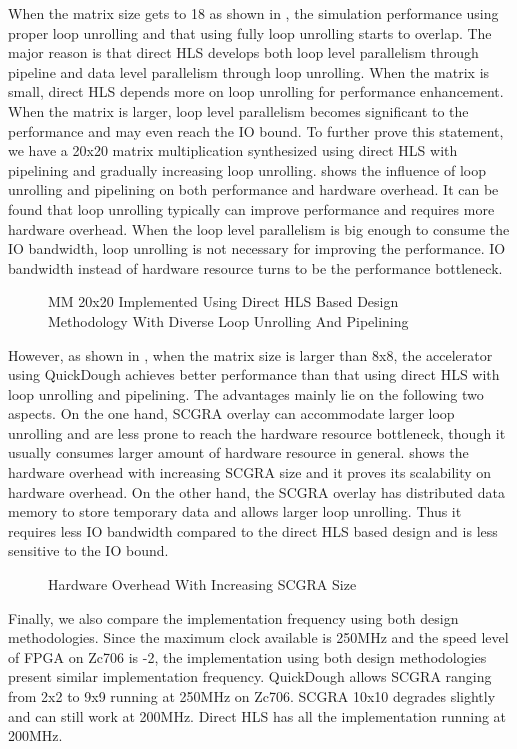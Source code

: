 When the matrix size gets to 18 as shown in , the simulation performance using proper loop unrolling and that using fully loop unrolling starts to overlap. The major reason is that direct HLS develops both loop level parallelism through pipeline and data level parallelism through loop unrolling. When the matrix is small, direct HLS depends more on loop unrolling for performance enhancement. When the matrix is larger, loop level parallelism becomes significant to the performance and may even reach the IO bound. To further prove this statement, we have a 20x20 matrix multiplication synthesized using direct HLS with pipelining and gradually increasing loop unrolling.  shows the influence of loop unrolling and pipelining on both performance and hardware overhead. It can be found that loop unrolling typically can improve performance and requires more hardware overhead. When the loop level parallelism is big enough to consume the IO bandwidth, loop unrolling is not necessary for improving the performance. IO bandwidth instead of hardware resource turns to be the performance bottleneck. 

\begin{figure}[htpb]
\caption{MM 20x20 Implemented Using Direct HLS Based Design Methodology With Diverse Loop Unrolling And Pipelining}
\label{fig:loop-unroll-and-pipeline}
\end{figure}

However, as shown in , when the matrix size is larger than 8x8, the accelerator using QuickDough achieves better performance than that using direct HLS with loop unrolling and pipelining. The advantages mainly lie on the following two aspects. On the one hand, SCGRA overlay can accommodate larger loop unrolling and are less prone to reach the hardware resource bottleneck, though it usually consumes larger amount of hardware resource in general.  shows the hardware overhead with increasing SCGRA size and it proves its scalability on hardware overhead. On the other hand, the SCGRA overlay has distributed data memory to store temporary data and allows larger loop unrolling. Thus it requires less IO bandwidth compared to the direct HLS based design and is less sensitive to the IO bound. 

\begin{figure}[htpb]
\caption{Hardware Overhead With Increasing SCGRA Size}
\label{fig:scgra-overhead-scalability}
\end{figure}

Finally, we also compare the implementation frequency using both design methodologies. Since the maximum clock available is 250MHz and the speed level of FPGA on Zc706 is -2, the implementation using both design methodologies present similar implementation frequency. QuickDough allows SCGRA ranging from 2x2 to 9x9 running at 250MHz on Zc706. SCGRA 10x10 degrades slightly and can still work at 200MHz. Direct HLS has all the implementation running at 200MHz. 
